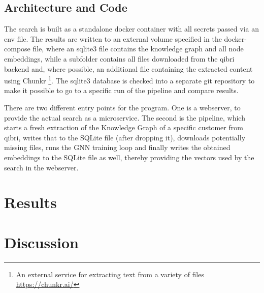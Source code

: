 \documentclass[draft,final]{vutinfth} %
\begin{document}
\section{Architecture and Code}
The search is built as a standalone docker container with all secrets passed via an env file. The results are written to an external volume specified in the docker-compose file, where an sqlite3 file contains the knowledge graph and all node embeddings, while a subfolder contains all files downloaded from the qibri backend and, where possible, an additional file containing the extracted content using Chunkr \footnote{An external service for extracting text from a variety of files \url{https://chunkr.ai/}}. The sqlite3 database is checked into a separate git repository to make it possible to go to a specific run of the pipeline and compare results.

There are two different entry points for the program. One is a webserver, to provide the actual search as a microservice. The second is the pipeline, which starts a fresh extraction of the Knowledge Graph of a specific customer from qibri, writes that to the SQLite file (after dropping it), downloads potentially missing files, runs the GNN training loop and finally writes the obtained embeddings to the SQLite file as well, thereby providing the vectors used by the search in the webserver.


\chapter{Results}


\chapter{Discussion}


\backmatter

\begin{aitools}
\end{aitools}

\begin{kitools}
\end{kitools}

\listoffigures %

\cleardoublepage %
\listoftables %


\printindex

\printglossaries



\end{document}
